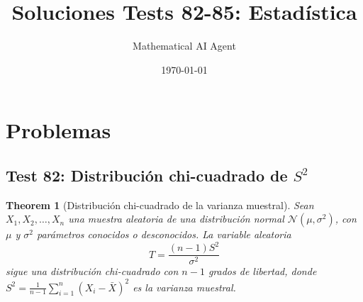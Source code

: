 \documentclass[11pt,a4paper]{article}
\title{Soluciones Tests 82-85: Estadística}
\author{Mathematical AI Agent}
\date{\today}
\theoremstyle{plain}
\newtheorem{theorem}{Theorem}[section]
\theoremstyle{definition}
\begin{document}
\maketitle

\section{Problemas}

\subsection{Test 82: Distribución chi-cuadrado de $S^2$}

\begin{theorem}[Distribución chi-cuadrado de la varianza muestral]
Sean $X_1, X_2, \ldots, X_n$ una muestra aleatoria de una distribución normal $\mathcal{N}(\mu, \sigma^2)$, con $\mu$ y $\sigma^2$ parámetros conocidos o desconocidos. La variable aleatoria
\[
T = \frac{(n-1)S^2}{\sigma^2}
\]
sigue una distribución chi-cuadrado con $n-1$ grados de libertad, donde $S^2 = \frac{1}{n-1}\sum_{i=1}^{n}(X_i - \bar{X})^2$ es la varianza muestral.
\end{theorem}
\end{document}
